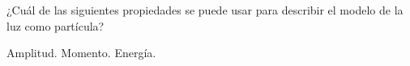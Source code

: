 ¿Cuál de las siguientes propiedades se puede usar para describir
el modelo de la luz como part\'icula?

\begin{oneparcheckboxes}
    \choice Amplitud.
    \CorrectChoice Momento.
    \CorrectChoice Energ\'ia.
\end{oneparcheckboxes}